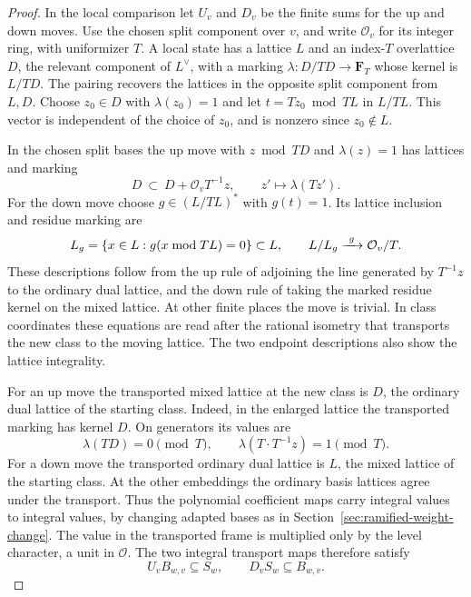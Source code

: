 \begin{proof}

In the local comparison let \(U_v\) and \(D_v\) be the
finite sums for the up and down moves. Use the chosen split
component over \(v\), and write \(\mathcal O_v\) for its
integer ring, with uniformizer \(T\). A local state has a
lattice \(L\) and an index-\(T\) overlattice \(D\), the
relevant component of \(L^\vee\), with a marking
\(\lambda:D/TD\to\mathbf F_T\) whose kernel is \(L/TD\).
The pairing recovers the lattices in the opposite split
component from \(L,D\). Choose \(z_0\in D\) with
\(\lambda(z_0)=1\) and let \(t=Tz_0\bmod TL\) in \(L/TL\).
This vector is independent of the choice of \(z_0\), and
is nonzero since \(z_0\notin L\).

In the chosen split bases the up move with \(z\bmod TD\)
and \(\lambda(z)=1\) has lattices and marking
\[
           D\ \subset\ D+\mathcal O_v T^{-1}z,\qquad
                        z'\longmapsto\lambda(Tz').
\]
For the down move choose \(g\in(L/TL)^*\) with \(g(t)=1\). Its lattice inclusion and residue marking are
\[
  L_g=\{x\in L:g(x\bmod TL)=0\}\subset L,\qquad L/L_g\xrightarrow{\ g\ }{\cal O}_v/T.
\]
These descriptions follow from the up rule of adjoining
the line generated by \(T^{-1}z\) to the ordinary dual
lattice, and the down rule of taking the marked residue
kernel on the mixed lattice. At other finite places the
move is trivial. In class coordinates these equations are
read after the rational isometry that transports the new
class to the moving lattice. The two endpoint descriptions
also show the lattice integrality.

For an up move the
transported mixed lattice at the new class is \(D\),
the ordinary dual lattice of the starting class.
Indeed, in the enlarged lattice the transported marking has kernel \(D\). On generators its values are
\[
  \lambda(TD)=0\pmod T,\qquad \lambda\!\left(T\cdot T^{-1}z\right)=1\pmod T.
\]
 For a
down move the transported ordinary dual lattice is \(L\),
the mixed lattice of the starting class. At the other
embeddings the ordinary basis lattices agree under the
transport. Thus the polynomial coefficient maps carry
integral values to integral values, by changing adapted
bases as in Section~\ref{sec:ramified-weight-change}.
The value in the transported frame is multiplied only by
the level character, a unit in \(\mathcal O\). The two integral transport maps therefore satisfy
\[
  U_v B_{w,v}\subseteq S_w,\qquad D_vS_w\subseteq B_{w,v}.
\]


\end{proof}
